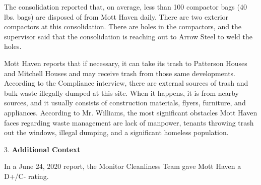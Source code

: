 The consolidation reported that, on average, less than 100 compactor bags (40 lbs. bags) are disposed of from Mott Haven daily. There are two exterior compactors at this consolidation. There are holes in the compactors, and the supervisor said that the consolidation is reaching out to Arrow Steel to weld the holes.

Mott Haven reports that if necessary, it can take its trash to Patterson Houses and Mitchell Houses and may receive trash from those same developments. According to the Compliance interview, there are external sources of trash and bulk waste illegally dumped at this site. When it happens, it is from nearby sources, and it usually consists of construction materials, flyers, furniture, and appliances. According to Mr. Williams, the most significant obstacles Mott Haven faces regarding waste management are lack of manpower, tenants throwing trash out the windows, illegal dumping, and a significant homeless population.

3. \textbf{Additional Context}

In a June 24, 2020 report, the Monitor Cleanliness Team gave Mott Haven a D+/C- rating. 